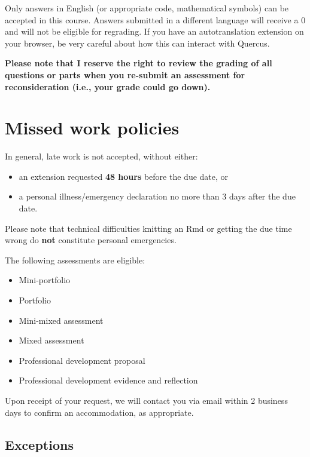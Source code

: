 \documentclass[
  openany]{book}
\begin{document}
Only answers in English (or appropriate code, mathematical symbols) can be accepted in this course. Answers submitted in a different language will receive a 0 and will not be eligible for regrading. If you have an autotranslation extension on your browser, be very careful about how this can interact with Quercus.

\textbf{Please note that I reserve the right to review the grading of all questions or parts when you re-submit an assessment for reconsideration (i.e., your grade could go down).}

\hypertarget{missed-work-policies}{%
\section{Missed work policies}\label{missed-work-policies}}

In general, late work is not accepted, without either:

\begin{itemize}
\item
  an extension requested \textbf{48 hours} before the due date, or
\item
  a personal illness/emergency declaration no more than 3 days after the due date.
\end{itemize}

Please note that technical difficulties knitting an Rmd or getting the due time wrong do \textbf{not} constitute personal emergencies.

The following assessments are eligible:

\begin{itemize}
\item
  Mini-portfolio
\item
  Portfolio
\item
  Mini-mixed assessment
\item
  Mixed assessment
\item
  Professional development proposal
\item
  Professional development evidence and reflection
\end{itemize}

Upon receipt of your request, we will contact you via email within 2 business days to confirm an accommodation, as appropriate.

\hypertarget{exceptions}{%
\subsection{Exceptions}\label{exceptions}}
\end{document}
